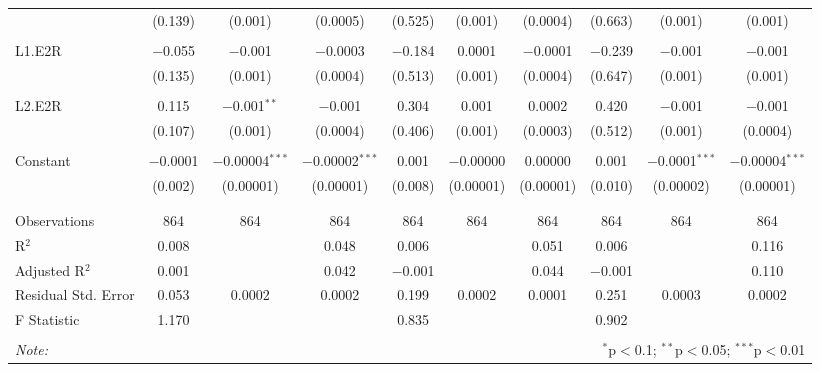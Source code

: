 \begin{table}[!htbp]
\begin{tabular}{@{\extracolsep{5pt}}lccccccccc}
  & (0.139) & (0.001) & (0.0005) & (0.525) & (0.001) & (0.0004) & (0.663) & (0.001) & (0.001) \\ 
  & & & & & & & & & \\ 
 L1.E2R & $-$0.055 & $-$0.001 & $-$0.0003 & $-$0.184 & 0.0001 & $-$0.0001 & $-$0.239 & $-$0.001 & $-$0.001 \\ 
  & (0.135) & (0.001) & (0.0004) & (0.513) & (0.001) & (0.0004) & (0.647) & (0.001) & (0.001) \\ 
  & & & & & & & & & \\ 
 L2.E2R & 0.115 & $-$0.001$^{**}$ & $-$0.001 & 0.304 & 0.001 & 0.0002 & 0.420 & $-$0.001 & $-$0.001 \\ 
  & (0.107) & (0.001) & (0.0004) & (0.406) & (0.001) & (0.0003) & (0.512) & (0.001) & (0.0004) \\ 
  & & & & & & & & & \\ 
 Constant & $-$0.0001 & $-$0.00004$^{***}$ & $-$0.00002$^{***}$ & 0.001 & $-$0.00000 & 0.00000 & 0.001 & $-$0.0001$^{***}$ & $-$0.00004$^{***}$ \\ 
  & (0.002) & (0.00001) & (0.00001) & (0.008) & (0.00001) & (0.00001) & (0.010) & (0.00002) & (0.00001) \\ 
  & & & & & & & & & \\ 
\hline \\[-1.8ex] 
Observations & 864 & 864 & 864 & 864 & 864 & 864 & 864 & 864 & 864 \\ 
R$^{2}$ & 0.008 &  & 0.048 & 0.006 &  & 0.051 & 0.006 &  & 0.116 \\ 
Adjusted R$^{2}$ & 0.001 &  & 0.042 & $-$0.001 &  & 0.044 & $-$0.001 &  & 0.110 \\ 
Residual Std. Error & 0.053 & 0.0002 & 0.0002 & 0.199 & 0.0002 & 0.0001 & 0.251 & 0.0003 & 0.0002 \\ 
F Statistic & 1.170 &  &  & 0.835 &  &  & 0.902 &  &  \\ 
\hline 
\hline \\[-1.8ex] 
\textit{Note:}  & \multicolumn{9}{r}{$^{*}$p$<$0.1; $^{**}$p$<$0.05; $^{***}$p$<$0.01} \\ 
\end{tabular} 
\end{table} 
